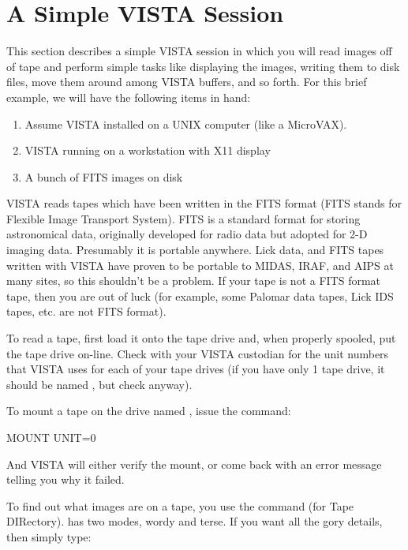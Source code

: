 {\section{A Simple VISTA Session}
\label{sec:tutsimple}

This section describes a simple VISTA session in which you will read images
off of tape and perform simple tasks like displaying the images, writing them
to disk files, move them around among VISTA buffers, and so forth.  For this
brief example, we will have the following items in hand:

\begin{enumerate}
      \item Assume VISTA installed on a UNIX computer (like a MicroVAX).
      \item VISTA running on a workstation with X11 display
      \item A bunch of FITS images on disk
\end{enumerate}

\medskip

\nobreak
VISTA reads tapes which have been written in the FITS format (FITS stands for
Flexible Image Transport System).  FITS is a standard format for storing
astronomical data, originally developed for radio data but adopted for 2-D
imaging data.  Presumably it is portable anywhere.  Lick data, and FITS tapes
written with VISTA have proven to be portable to MIDAS, IRAF, and AIPS at many
sites, so this shouldn't be a problem.  If your tape is not a FITS format
tape, then you are out of luck (for example, some Palomar data tapes, Lick IDS
tapes, etc. are not FITS format).

To read a tape, first load it onto the tape drive and, when properly spooled,
put the tape drive on-line.  Check with your VISTA custodian for the unit
numbers that VISTA uses for each of your tape drives (if you have only 1 tape
drive, it should be named , but check anyway).

\noindent
To mount a tape on the drive named , issue the command:

\begin{command}
      \item MOUNT UNIT=0
\end{command}

\noindent
And VISTA will either verify the mount, or come back with an error message
telling you why it failed.

To find out what images are on a tape, you use the  command (for
Tape DIRectory).  has two modes, wordy and terse.  If you want all
the gory details, then simply type:

}
